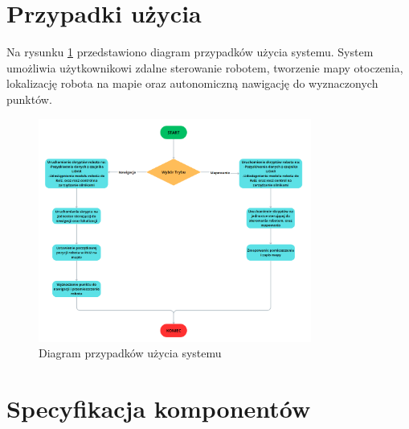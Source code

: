 \documentclass[a4paper,twoside,12pt]{book}
\begin{document}
\section{Przypadki użycia}
Na rysunku \ref{fig:use-case} przedstawiono diagram przypadków użycia systemu. System umożliwia użytkownikowi zdalne sterowanie robotem, tworzenie mapy otoczenia, lokalizację robota na mapie oraz autonomiczną nawigację do wyznaczonych punktów. 
\begin{figure}[!hb]
\centering
\includegraphics[width=0.8\textwidth]{images/UML.png}
\caption{Diagram przypadków użycia systemu}
\label{fig:use-case}
\end{figure}
\newpage
\section{Specyfikacja komponentów}
\end{document}
